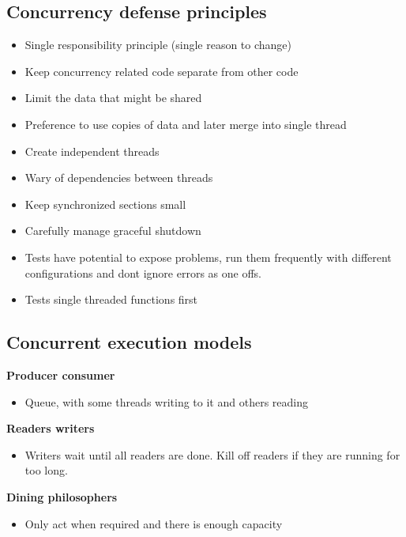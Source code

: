 \documentclass[11pt]{scrartcl} %
\begin{document}
\subsection{Concurrency defense principles}

\begin{itemize}
	\item Single responsibility principle (single reason to change)
	\item Keep concurrency related code separate from other code 
  
  	\item Limit the data that might be shared
	\item Preference to use copies of data and later merge into single thread
	\item Create independent threads
  
	\item Wary of dependencies between threads
	\item Keep synchronized sections small
	\item Carefully manage graceful shutdown
	\item Tests have potential to expose problems, run them frequently with different configurations and dont ignore errors as one offs.
  
	\item Tests single threaded functions first
\end{itemize}

\subsection{Concurrent execution models}

\textbf{Producer consumer}
\begin{itemize}
	\item Queue, with some threads writing to it and others reading		
\end{itemize}

\textbf{Readers writers}
\begin{itemize}
	\item Writers wait until all readers are done. Kill off readers if they are running for too long.
\end{itemize}

\textbf{Dining philosophers}
\begin{itemize}
	\item Only act when required and there is enough capacity
\end{itemize}
\end{document}
